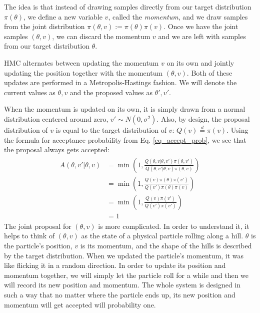 \documentclass[12pt]{article}
\begin{document}
The idea is that instead of drawing samples directly from our target distribution $\pi(\theta)$, we define a new variable $v$, called the \textit{momentum}, and we draw samples from the joint distribution $\pi(\theta, v) := \pi(\theta)\pi(v)$. Once we have the joint samples $(\theta, v)$, we can discard the momentum $v$ and we are left with samples from our target distribution $\theta$.

HMC alternates between updating the momentum $v$ on its own and jointly updating the position together with the momentum $(\theta, v)$. Both of these updates are performed in a Metropolis-Hastings fashion. We will denote the current values as $\theta, v$ and the proposed values as $\theta', v'$.

When the momentum is updated on its own, it is simply drawn from a normal distribution centered around zero, $v' \sim N(0, \sigma^2)$. Also, by design, the proposal distribution of $v$ is equal to the target distribution of $v$: $Q(v) \overset{d}{=} \pi(v)$. Using the formula for acceptance probability from Eq. \ref{eq_accept_prob}, we see that the proposal always gets accepted:
\begin{align}
\begin{split}
A(\theta,v'|\theta,v) &= \min \left(1, \frac{Q(\theta,v|\theta,v')\pi(\theta,v')}{Q(\theta,v'|\theta,v)\pi(\theta,v)} \right) \\
&= \min \left(1, \frac{Q(v)\pi(\theta)\pi(v')}{Q(v')\pi(\theta)\pi(v)} \right) \\
&= \min \left(1, \frac{Q(v)\pi(v')}{Q(v')\pi(v')} \right) \\
&= 1
\end{split}
\end{align}
The joint proposal for $(\theta, v)$ is more complicated. In order to understand it, it helps to think of $(\theta, v)$ as the state of a physical particle rolling along a hill. $\theta$ is the particle's position, $v$ is its momentum, and the shape of the hills is described by the target distribution. When we updated the particle's momentum, it was like flicking it in a random direction. In order to update its position and momentum together, we will simply let the particle roll for a while and then we will record its new position and momentum. The whole system is designed in such a way that no matter where the particle ends up, its new position and momentum will get accepted will probability one.
\end{document}
